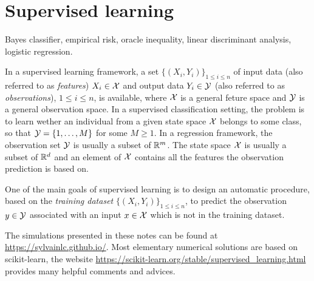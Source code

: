 \chapter{Supervised learning}
\minitoc
\begin{kwd}
Bayes classifier, empirical risk, oracle inequality, linear discriminant analysis, logistic regression.
\end{kwd}


In a supervised learning framework, a set $\{(X_i,Y_i)\}_{1\leqslant i \leqslant n}$  of input data (also referred to as {\em features}) $X_i\in\mathcal{X}$ and output data $Y_i\in\mathcal{Y}$ (also referred to as {\em observations}), $1\leqslant i \leqslant n$, is available, where $\mathcal{X}$ is a general feture space and $\mathcal{Y}$ is a general observation space. In a supervised classification setting, the problem is to learn wether an individual from a given state space $\mathcal{X}$ belongs to some class, so that $\mathcal{Y} = \{1,\ldots,M\}$ for some $M\geqslant 1$. In a regression framework, the observation set $\mathcal{Y}$ is usually a subset of $\mathbb{R}^m$. The state space $\mathcal{X}$ is usually a subset of $\mathbb{R}^d$ and an element of $\mathcal{X}$ contains all the features the observation prediction is  based on.

One of the main goals of supervised learning is to design an automatic procedure, based on  the {\em training dataset} $\{(X_i,Y_i)\}_{1\leqslant i \leqslant n}$,  to predict the observation $y\in\mathcal{Y}$ associated with an input $x\in\mathcal{X}$ which is not in the training dataset.

\medskip

The simulations presented in these notes can be found at \url{https://sylvainlc.github.io/}. Most elementary numerical solutions are based on scikit-learn, the website \url{https://scikit-learn.org/stable/supervised\_learning.html} provides many helpful comments and advices.


